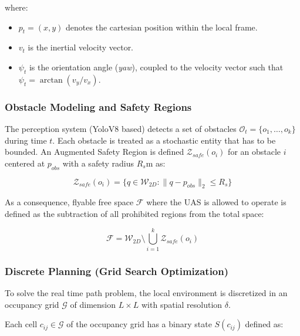 \documentclass[a4paper, 11pt]{article}
\begin{document}
where: 
\begin{itemize}
    \item $p_t = (x, y)$ denotes the cartesian position within the local frame. 
    \item $v_t$ is the inertial velocity vector.
    \item $\psi_t$ is the orientation angle (\textit{yaw}), coupled to the velocity vector such that $\psi_t = \arctan(v_y / v_x)$.
\end{itemize}

\subsubsection{Obstacle Modeling and Safety Regions}

The perception system (YoloV8 based) detects a set of obstacles $\mathcal{O}_t = \{o_1, \dots, o_k\}$ during time $t$. Each obstacle is treated as a stochastic entity that has to be bounded. 
An Augmented Safety Region is defined $\mathcal{Z}_{safe}(o_i)$ for an obstacle $i$ centered at $p_{obs}$ with a safety radius $R_s \text{m}$ as: %

\begin{equation}
    \mathcal{Z}_{safe}(o_i) = \{ q \in \mathcal{W}_{2D} : \| q - p_{obs} \|_2 \le R_s \}
\end{equation}

As a consequence, flyable free space $\mathcal{F}$ where the UAS is allowed to operate is defined as the subtraction of all prohibited regions from the total space:

\begin{equation}
    \mathcal{F} = \mathcal{W}_{2D} \setminus \bigcup_{i=1}^{k} \mathcal{Z}_{safe}(o_i)
\end{equation}

\subsubsection{Discrete Planning (Grid Search Optimization)}

To solve the real time path problem, the local environment is discretized in an occupancy grid $\mathcal{G}$ of dimension $L \times L$ with spatial resolution $\delta$. %

Each cell  $c_{ij} \in \mathcal{G}$ of the occupancy grid has a binary state $S(c_{ij})$ defined as: 
\end{document}
